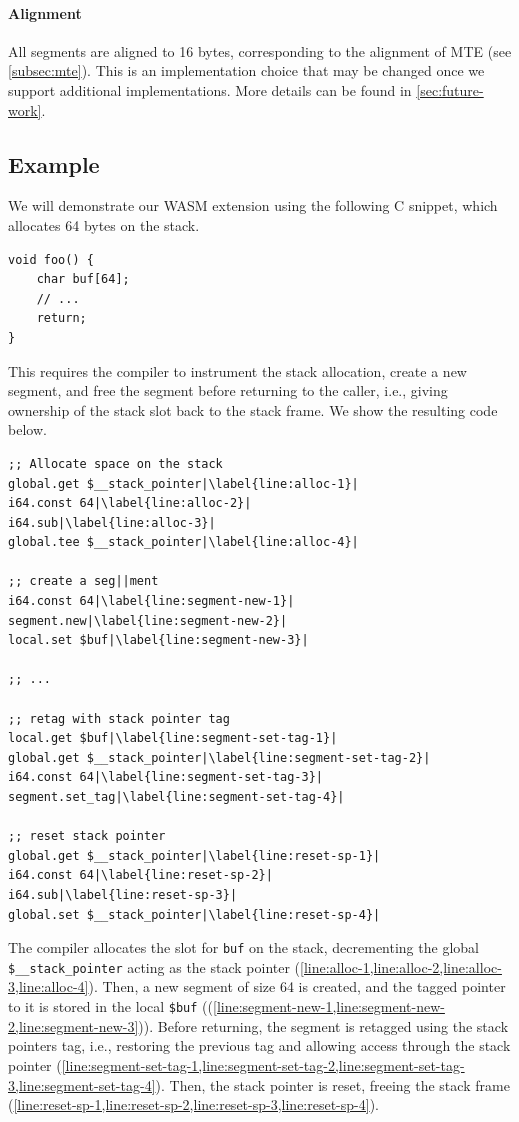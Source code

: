 \paragraph{Alignment}
All segments are aligned to 16 bytes, corresponding to the alignment of \ac{MTE} (see \cref{subsec:mte}).
This is an implementation choice that may be changed once we support additional implementations.
More details can be found in \cref{sec:future-work}.

\subsection{Example}
\label{subsec:example}

We will demonstrate our \ac{WASM} extension using the following C snippet, which allocates 64 bytes on the stack.
\begin{lstlisting}[frame=h,style=customc,
    label={lst:wasm-example-c}]
void foo() {
    char buf[64];
    // ...
    return;
}
\end{lstlisting}

This requires the compiler to instrument the stack allocation, create a new segment, and free the segment before returning to the caller, i.e., giving ownership of the stack slot back to the stack frame.
We show the resulting code below.

\begin{lstlisting}[frame=h,style=customwasm,
    label={lst:wasm-example},escapechar=|]
;; Allocate space on the stack
global.get $__stack_pointer|\label{line:alloc-1}|
i64.const 64|\label{line:alloc-2}|
i64.sub|\label{line:alloc-3}|
global.tee $__stack_pointer|\label{line:alloc-4}|

;; create a seg||ment
i64.const 64|\label{line:segment-new-1}|
segment.new|\label{line:segment-new-2}|
local.set $buf|\label{line:segment-new-3}|

;; ...

;; retag with stack pointer tag
local.get $buf|\label{line:segment-set-tag-1}|
global.get $__stack_pointer|\label{line:segment-set-tag-2}|
i64.const 64|\label{line:segment-set-tag-3}|
segment.set_tag|\label{line:segment-set-tag-4}|

;; reset stack pointer
global.get $__stack_pointer|\label{line:reset-sp-1}|
i64.const 64|\label{line:reset-sp-2}|
i64.sub|\label{line:reset-sp-3}|
global.set $__stack_pointer|\label{line:reset-sp-4}|
\end{lstlisting}

The compiler allocates the slot for \texttt{buf} on the stack, decrementing the global \texttt{\$\_\_stack\_pointer} acting as the stack pointer (\cref{line:alloc-1,line:alloc-2,line:alloc-3,line:alloc-4}).
Then, a new segment of size 64 is created, and the tagged pointer to it is stored in the local \lstinline[style=customwasm]{$buf} ((\cref{line:segment-new-1,line:segment-new-2,line:segment-new-3})).
Before returning, the segment is retagged using the stack pointers tag, i.e., restoring the previous tag and allowing access through the stack pointer (\cref{line:segment-set-tag-1,line:segment-set-tag-2,line:segment-set-tag-3,line:segment-set-tag-4}).
Then, the stack pointer is reset, freeing the stack frame (\cref{line:reset-sp-1,line:reset-sp-2,line:reset-sp-3,line:reset-sp-4}).

